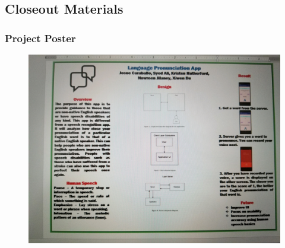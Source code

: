

\subsection{Closeout Materials}


\subsubsection{Project Poster}
\begin{figure}[h!]
	\centering
   	\includegraphics[width=1\textwidth]{figures/poster.jpeg}
\end{figure}

